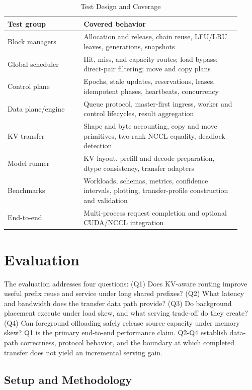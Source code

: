 \documentclass{article}
\begin{document}
\begin{table}[t]
  \centering
  \caption{Test Design and Coverage}
  \label{tab:tests}
  \footnotesize
  \setlength{\tabcolsep}{3.5pt}
  \begin{tabular}{@{}p{0.30\linewidth}p{0.62\linewidth}@{}}
    \toprule
    Test group & Covered behavior \\
    \midrule
    Block managers & Allocation and release, chain reuse, LFU/LRU leaves, generations, snapshots \\
    Global scheduler & Hit, miss, and capacity routes; load bypass; direct-pair filtering; move and copy plans \\
    Control plane & Epochs, stale updates, reservations, leases, idempotent phases, heartbeats, concurrency \\
    Data plane/engine & Queue protocol, master-first ingress, worker and control lifecycles, result aggregation \\
    KV transfer & Shape and byte accounting, copy and move primitives, two-rank NCCL equality, deadlock detection \\
    Model runner & KV layout, prefill and decode preparation, dtype consistency, transfer adapters \\
    Benchmarks & Workloads, schemas, metrics, confidence intervals, plotting, transfer-profile construction and validation \\
    End-to-end & Multi-process request completion and optional CUDA/NCCL integration \\
    \bottomrule
  \end{tabular}
\end{table}

\section{Evaluation}
\label{sec:eval}

The evaluation addresses four questions: (Q1) Does KV-aware routing improve useful prefix reuse and service under long shared prefixes? (Q2) What latency and bandwidth does the transfer data path provide? (Q3) Do background placement execute under load skew, and what serving trade-off do they create? (Q4) Can foreground offloading safely release source capacity under memory skew? Q1 is the primary end-to-end performance claim. Q2-Q4 establish data-path correctness, protocol behavior, and the boundary at which completed transfer does not yield an incremental serving gain.

\subsection{Setup and Methodology}
\end{document}
